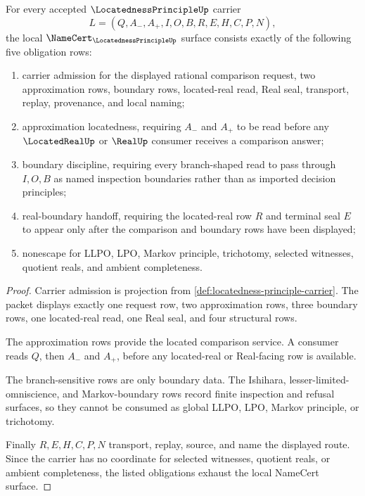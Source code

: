\begin{theorem}
\label{thm:locatedness-principle-namecert-obligations}
For every accepted $\LocatednessPrincipleUp$ carrier
$$
L=(Q,A_-,A_+,I,O,B,R,E,H,C,P,N),
$$
the local $\NameCert_{\LocatednessPrincipleUp}$ surface consists exactly of the following five obligation rows:
\begin{enumerate}
\item carrier admission for the displayed rational comparison request, two approximation rows, boundary rows, located-real read, Real seal, transport, replay, provenance, and local naming;
\item approximation locatedness, requiring $A_-$ and $A_+$ to be read before any $\LocatedRealUp$ or $\RealUp$ consumer receives a comparison answer;
\item boundary discipline, requiring every branch-shaped read to pass through $I,O,B$ as named inspection boundaries rather than as imported decision principles;
\item real-boundary handoff, requiring the located-real row $R$ and terminal seal $E$ to appear only after the comparison and boundary rows have been displayed;
\item nonescape for LLPO, LPO, Markov principle, trichotomy, selected witnesses, quotient reals, and ambient completeness.
\end{enumerate}
\end{theorem}
\begin{proof}
Carrier admission is projection from \autoref{def:locatedness-principle-carrier}. The packet displays exactly one request row, two approximation rows, three boundary rows, one located-real read, one Real seal, and four structural rows.

The approximation rows provide the located comparison service. A consumer reads $Q$, then $A_-$ and $A_+$, before any located-real or Real-facing row is available.

The branch-sensitive rows are only boundary data. The Ishihara, lesser-limited-omniscience, and Markov-boundary rows record finite inspection and refusal surfaces, so they cannot be consumed as global LLPO, LPO, Markov principle, or trichotomy.

Finally $R,E,H,C,P,N$ transport, replay, source, and name the displayed route. Since the carrier has no coordinate for selected witnesses, quotient reals, or ambient completeness, the listed obligations exhaust the local NameCert surface.
\end{proof}


